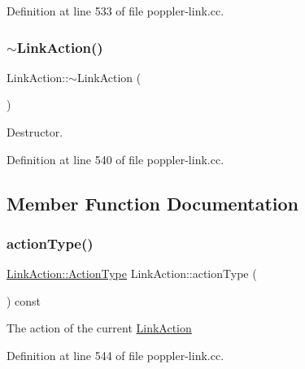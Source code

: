 Definition at line 533 of file poppler-\/link.\+cc.

\mbox{\label{class_poppler_1_1_link_action_a3d542d57f2ce813e5d275da4c9d7e140}} 
\subsubsection{\texorpdfstring{$\sim$\+Link\+Action()}{~LinkAction()}}
{\footnotesize\ttfamily Link\+Action\+::$\sim$\+Link\+Action (\begin{DoxyParamCaption}{ }\end{DoxyParamCaption})}

Destructor. 

Definition at line 540 of file poppler-\/link.\+cc.



\subsection{Member Function Documentation}
\mbox{\label{class_poppler_1_1_link_action_aed2145fc91e2ff0a3339cb9c3cbb0d3b}} 
\subsubsection{\texorpdfstring{action\+Type()}{actionType()}}
{\footnotesize\ttfamily \hyperlink{class_poppler_1_1_link_action_af9c6ee08681c0993083a6f817f9d099c}{Link\+Action\+::\+Action\+Type} Link\+Action\+::action\+Type (\begin{DoxyParamCaption}{ }\end{DoxyParamCaption}) const}

The action of the current \hyperlink{class_poppler_1_1_link_action}{Link\+Action} 

Definition at line 544 of file poppler-\/link.\+cc.

\mbox{\label{class_poppler_1_1_link_action_a20ec1a625cb94bb9a44f5399c6a5b9fd}} 
